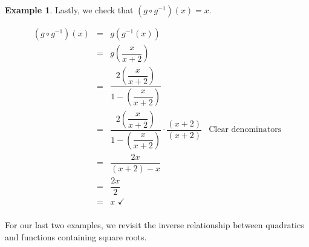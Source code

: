 \documentclass[11pt]{book}
\theoremstyle{definition}  %
\newtheorem{example}{Example}[chapter]
\begin{document}
\begin{example}
\newpage
Lastly, we check that $\left(g \circ g^{-1} \right)(x) = x $.

\[ \begin{array}{rclr}
\left(g \circ g^{-1} \right)(x) & = & g\left(g^{-1}(x)\right) & \\ [15pt]
 & = & g \left(\dfrac{x}{x+2}\right) & \\ [15pt]
& = & \dfrac{ 2\left(\dfrac{x}{x+2}\right)}{ 1-\left(\dfrac{x}{x+2}\right)} \\ [30pt]
& = & \dfrac{ 2\left(\dfrac{x}{x+2}\right)}{ 1-\left(\dfrac{x}{x+2}\right)} \cdot \dfrac{(x+2)}{(x+2)}  & \mbox{Clear denominators} \\ [30pt]
& = & \dfrac{ 2x}{ (x+2) -x} & \\ [15pt]
& = & \dfrac{2x}{2} & \\ [15pt]
& = & x \, \, \checkmark \\
\end{array} \]
\end{example}  

For our last two examples, we revisit the inverse relationship between quadratics and functions containing square roots.
\end{document}
